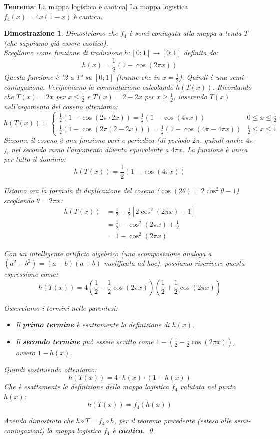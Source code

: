\documentclass[openany]{book}
\newtheorem*{dimostrazione}{Dimostrazione}
\theoremstyle{definition}
\theoremstyle{remark}
\begin{document}
\textbf{Teorema}: La mappa logistica è caotica]
La mappa logistica $f_4(x) = 4x(1-x)$ è caotica.


\begin{dimostrazione}
Dimostriamo che $f_4$ è semi-coniugata alla mappa a tenda $T$ (che sappiamo già essere caotica). \\
Scegliamo come funzione di traduzione $h: [0; 1] \to [0; 1]$ definita da:
$$ h(x) = \frac{1}{2} (1 - \cos(2\pi x)) $$
Questa funzione è "2 a 1" su $[0; 1]$ (tranne che in $x = \frac{1}{2}$). Quindi è una semi-coniugazione.
Verifichiamo la commutazione calcolando $h(T(x))$.
Ricordando che $T(x) = 2x$ per $x \leq \frac{1}{2}$ e $T(x) = 2-2x$ per $x \geq \frac{1}{2}$, inserendo $T(x)$ nell'argomento del coseno otteniamo:
$$
h(T(x)) = 
\begin{cases}
    \frac{1}{2} (1 - \cos(2\pi \cdot 2x)) = \frac{1}{2} (1 - \cos(4\pi x)) & 0 \leq x \leq \frac{1}{2} \\
    \frac{1}{2} (1 - \cos(2\pi(2 - 2x))) = \frac{1}{2} (1 - \cos(4\pi - 4\pi x)) & \frac{1}{2} \leq x \leq 1
\end{cases}
$$
Siccome il coseno è una funzione pari e periodica (di periodo $2\pi$, quindi anche $4\pi$), nel secondo ramo l'argomento diventa equivalente a $4\pi x$. La funzione è unica per tutto il dominio:
$$ h(T(x)) = \frac{1}{2} (1 - \cos(4\pi x)) $$

Usiamo ora la formula di duplicazione del coseno ($\cos(2\theta) = 2\cos^2\theta - 1$) scegliendo $\theta = 2\pi x$:
\begin{align*}
    h(T(x)) &= \frac{1}{2} - \frac{1}{2} \left[ 2\cos^2(2\pi x) - 1 \right] \\
    &= \frac{1}{2} - \cos^2(2\pi x) + \frac{1}{2} \\
    &= 1 - \cos^2(2\pi x) 
\end{align*}

Con un intelligente artificio algebrico (una scomposizione analoga a $(a^2-b^2) = (a-b)(a+b)$ modificata ad hoc), possiamo riscrivere questa espressione come:
$$ h(T(x)) = 4 \left( \frac{1}{2} - \frac{1}{2}\cos(2\pi x) \right) \left( \frac{1}{2} + \frac{1}{2}\cos(2\pi x) \right) $$

Osserviamo i termini nelle parentesi:
\begin{itemize}
    \item Il \textbf{primo termine} è esattamente la definizione di $h(x)$.
    \item Il \textbf{secondo termine} può essere scritto come $1 - \left( \frac{1}{2} - \frac{1}{2}\cos(2\pi x) \right)$, ovvero $1 - h(x)$.
\end{itemize}

Quindi sostituendo otteniamo:
$$ h(T(x)) = 4 \cdot h(x) \cdot (1 - h(x)) $$
Che è esattamente la definizione della mappa logistica $f_4$ valutata nel punto $h(x)$:
$$ h(T(x)) = f_4(h(x)) $$

Avendo dimostrato che $h \circ T = f_4 \circ h$, per il teorema precedente (esteso alle semi-coniugazioni) la mappa logistica $f_4$ è \textbf{caotica}. \qed
\end{dimostrazione}
\end{document}
